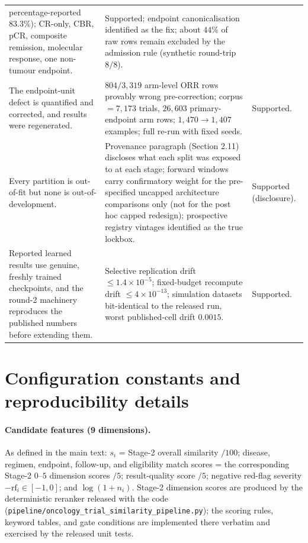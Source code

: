 \documentclass[11pt]{article}
\begin{document}
\begin{longtable}{p{} p{} p{}}
percentage-reported $83.3\%$); CR-only, CBR, pCR, composite remission,
molecular response, one non-tumour endpoint. & Supported; endpoint
canonicalisation identified as the fix; about $44\%$ of raw rows remain
excluded by the admission rule (synthetic round-trip $8/8$). \\
The endpoint-unit defect is quantified and corrected, and results were
regenerated. & $804/3{,}319$ arm-level ORR rows provably wrong pre-correction;
corpus $= 7{,}173$ trials, $26{,}603$ primary-endpoint arm rows;
$1{,}470 \to 1{,}407$ examples; full re-run with fixed seeds. & Supported. \\
Every partition is out-of-fit but none is out-of-development. & Provenance
paragraph (Section 2.11) discloses what each split was exposed to at each
stage; forward windows carry confirmatory weight for the pre-specified
uncapped architecture comparisons only (not for the post hoc capped
redesign); prospective registry
vintages identified as the true lockbox. & Supported (disclosure). \\
Reported learned results use genuine, freshly trained checkpoints, and the
round-2 machinery reproduces the published numbers before extending them. &
Selective replication drift $\le 1.4\times10^{-5}$; fixed-budget recompute
drift $\le 4\times10^{-13}$; simulation datasets bit-identical to the
released run, worst published-cell drift $0.0015$. & Supported. \\
\bottomrule
\end{longtable}

\section{Configuration constants and reproducibility details}

\paragraph{Candidate features (9 dimensions).} As defined in the main text:
$s_i$ = Stage-2 overall similarity $/100$; disease, regimen, endpoint,
follow-up, and eligibility match scores = the corresponding Stage-2 $0$--$5$
dimension scores $/5$; result-quality score $/5$; negative red-flag severity
$-\mathrm{rf}_i \in [-1,0]$; and $\log(1+n_i)$. Stage-2 dimension scores are
produced by the deterministic reranker released with the code
(\texttt{pipeline/\allowbreak oncology\_trial\_similarity\_pipeline.py}); the scoring
rules, keyword tables, and gate conditions are implemented there verbatim and
exercised by the released unit tests.
\end{document}
